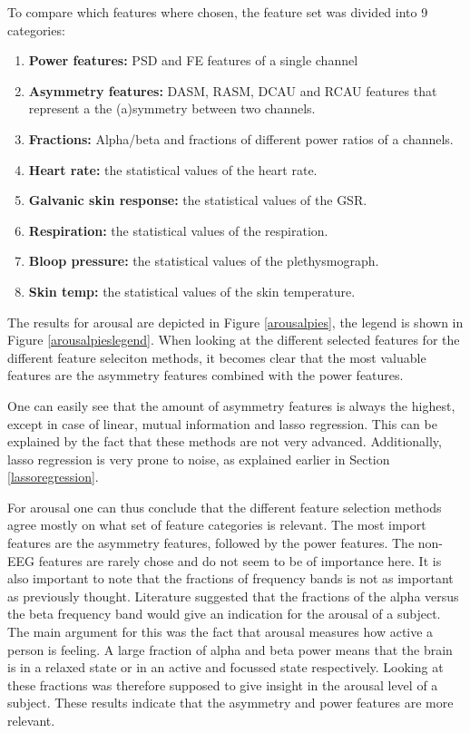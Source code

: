 To compare which features where chosen, the feature set was divided into 9 categories:
\begin{enumerate}
\item \textbf{Power features:} PSD and FE features of a single channel
\item \textbf{Asymmetry features:} DASM, RASM, DCAU and RCAU features that represent a the (a)symmetry between two channels.
\item \textbf{Fractions:} Alpha/beta and fractions of different power ratios of a channels.

\item \textbf{Heart rate:} the statistical values of the heart rate.
\item \textbf{Galvanic skin response:} the statistical values of the GSR.
\item \textbf{Respiration:} the statistical values of the respiration.
\item \textbf{Bloop pressure:} the statistical values of the plethysmograph.
\item \textbf{Skin temp:} the statistical values of the skin temperature.
\end{enumerate} 

The results for arousal are depicted in Figure \ref{arousalpies}, the legend is shown in Figure \ref{arousalpieslegend}. When looking at the different selected features for the different feature seleciton methods, it becomes clear that the most valuable features are the asymmetry features combined with the power features.

\npar

One can easily see that the amount of asymmetry features is always the highest, except in case of linear, mutual information and lasso regression. This can be explained by the fact that these methods are not very advanced. Additionally, lasso regression is very prone to noise, as explained earlier in Section \ref{lassoregression}. 

\npar

For arousal one can thus conclude that the different feature selection methods agree mostly on what set of feature categories is relevant. The most import features are the asymmetry features, followed by the power features. The non-EEG features are rarely chose and do not seem to be of importance here. It is also important to note that the fractions of frequency bands is not as important as previously thought. Literature suggested that the fractions of the alpha versus the beta frequency band would give an indication for the arousal of a subject. The main argument for this was the fact that arousal measures how active a person is feeling. A large fraction of alpha and beta power means that the brain is in a relaxed state or in an active and focussed state respectively. Looking at these fractions was therefore supposed to give insight in the arousal level of a subject. These results indicate that the asymmetry and power features are more relevant.

